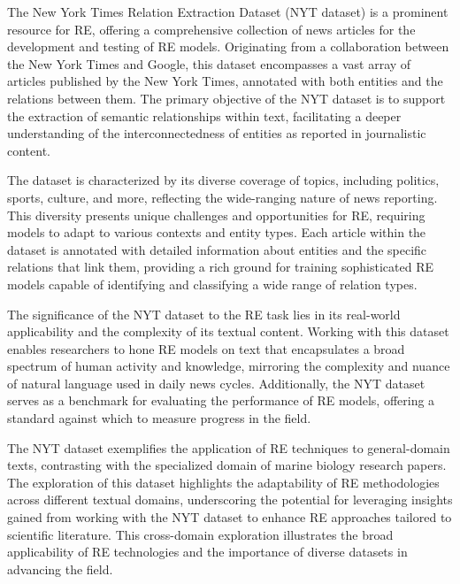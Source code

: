 The New York Times Relation Extraction Dataset (NYT dataset) is a prominent resource for RE, offering a comprehensive collection of news articles for the development and testing of RE models. Originating from a collaboration between the New York Times and Google, this dataset encompasses a vast array of articles published by the New York Times, annotated with both entities and the relations between them\cite{NYTRE}. The primary objective of the NYT dataset is to support the extraction of semantic relationships within text, facilitating a deeper understanding of the interconnectedness of entities as reported in journalistic content.

The dataset is characterized by its diverse coverage of topics, including politics, sports, culture, and more, reflecting the wide-ranging nature of news reporting. This diversity presents unique challenges and opportunities for RE, requiring models to adapt to various contexts and entity types. Each article within the dataset is annotated with detailed information about entities and the specific relations that link them, providing a rich ground for training sophisticated RE models capable of identifying and classifying a wide range of relation types.

The significance of the NYT dataset to the RE task lies in its real-world applicability and the complexity of its textual content. Working with this dataset enables researchers to hone RE models on text that encapsulates a broad spectrum of human activity and knowledge, mirroring the complexity and nuance of natural language used in daily news cycles. Additionally, the NYT dataset serves as a benchmark for evaluating the performance of RE models, offering a standard against which to measure progress in the field.

The NYT dataset exemplifies the application of RE techniques to general-domain texts, contrasting with the specialized domain of marine biology research papers. The exploration of this dataset highlights the adaptability of RE methodologies across different textual domains, underscoring the potential for leveraging insights gained from working with the NYT dataset to enhance RE approaches tailored to scientific literature. This cross-domain exploration illustrates the broad applicability of RE technologies and the importance of diverse datasets in advancing the field.

